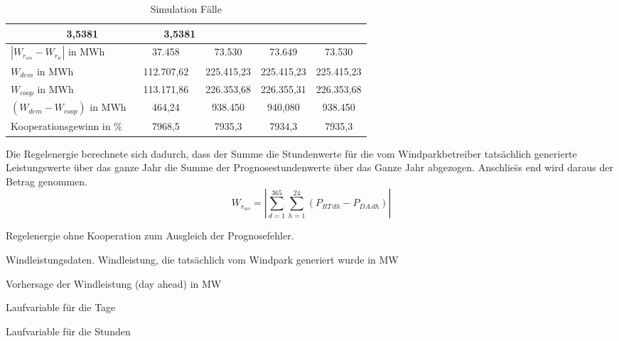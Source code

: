\begin{table}
{\begin{tabularx}{\textwidth}{X|X|X|X|X|X|X|X|X|}
\multicolumn{2}{c|}{3,5381} &
\multicolumn{2}{c|}{3,5381}\\
\hline
\multicolumn{1}{|l|}{$|W_{r_{wo}} - W_{r_{w}}|$ in MWh} &
\multicolumn{2}{c|}{37.458} &
\multicolumn{2}{c|}{73.530} &
\multicolumn{2}{c|}{73.649} &
\multicolumn{2}{c|}{73.530}\\
\hline
\hline
\multicolumn{1}{|l|}{$W_{dem}$ in MWh } & \multicolumn{2}{c|}{112.707,62} &
\multicolumn{2}{c|}{225.415,23} &
\multicolumn{2}{c|}{225.415,23} &
\multicolumn{2}{c|}{225.415,23}\\
\hline
\multicolumn{1}{|l|}{$W_{coop}$ in MWh} & \multicolumn{2}{c|}{113.171,86} &
\multicolumn{2}{c|}{226.353,68} &
\multicolumn{2}{c|}{226.355,31} &
\multicolumn{2}{c|}{226.353,68}\\
\hline
\multicolumn{1}{|l|}{$(W_{dem} - W_{coop})$ in MWh} & \multicolumn{2}{c|}{464,24} &
\multicolumn{2}{c|}{938.450} &
\multicolumn{2}{c|}{940,080} &
\multicolumn{2}{c|}{938.450}\\
\hline
\hline
\multicolumn{1}{|l|}{Kooperationsgewinn in \%} & \multicolumn{2}{c|}{7968,5} &
\multicolumn{2}{c|}{7935,3} &
\multicolumn{2}{c|}{7934,3} &
\multicolumn{2}{c|}{7935,3}\\
\hline
\end{tabularx}
}
\caption{Simulation F\"alle}
\label{t:faelle}
\end{table}

Die Regelenergie berechnete sich dadurch, dass der Summe die Stundenwerte f\"ur
die vom Windparkbetreiber tats\"achlich generierte Leistungswerte \"uber
das ganze Jahr die Summe der Prognosestundenwerte \"uber das Ganze Jahr
abgezogen. Anschlie\"ss end wird daraus der Betrag genommen.
\begin{equation}
	W_{r_{wo}} = |\sum^{365}_{d=1}\sum^{24}_{h=1}(P_{RT\,dh}-P_{DA\,dh})|
\label{eq:wrwo}
\end{equation}
\begin{description}[\dth]
\item[$W_{r_{wo}}$] Regelenergie ohne Kooperation zum Ausgleich der
Prognosefehler.
\item[$P_{RT}$] Windleistungsdaten. Windleistung, die tats\"achlich vom
Windpark generiert wurde in MW
\item[$P_{DA}$] Vorhersage der Windleistung (day ahead) in MW
\item[$d$] Laufvariable f\"ur die Tage
\item[$h$] Laufvariable f\"ur die Stunden
\end{description}

